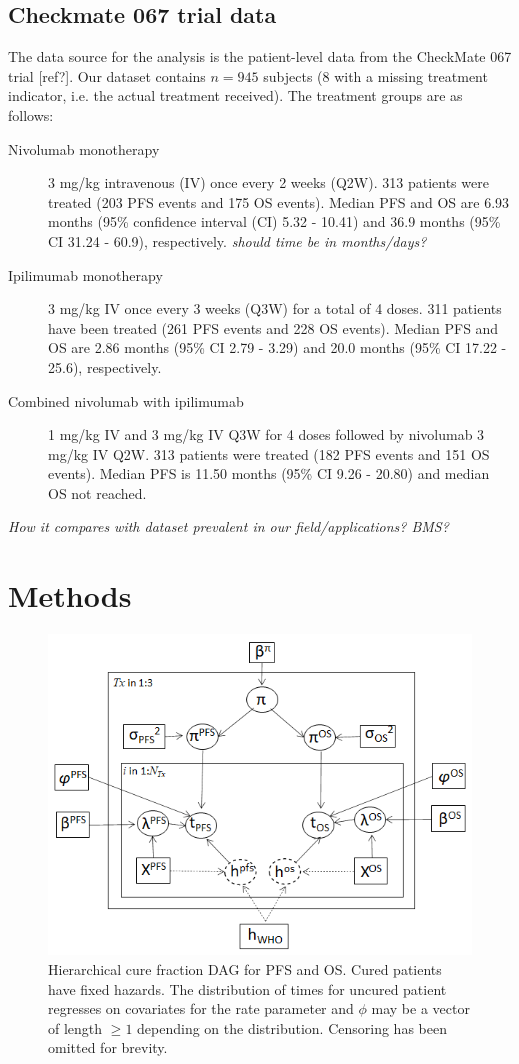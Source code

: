 \documentclass[AMA,STIX1COL]{WileyNJD-v2}
\begin{document}
\subsection{Checkmate 067 trial data}
The data source for the analysis is the patient-level data from the CheckMate 067 trial [ref?].
Our dataset contains $n = 945$ subjects (8 with a missing treatment indicator, i.e. the actual treatment received).
The treatment groups are as  follows:
\begin{description}
\item[Nivolumab monotherapy] 3 mg/kg intravenous (IV) once every 2 weeks (Q2W). 313 patients were treated (203 PFS events and 175 OS events).
Median PFS and OS are 6.93 months (95\% confidence interval (CI) 5.32 - 10.41) and 36.9 months (95\% CI 31.24 - 60.9), respectively. {\it should time be in months/days?}
\item[Ipilimumab monotherapy] 3 mg/kg IV once every 3 weeks (Q3W) for a total of 4 doses.
311 patients have been treated (261 PFS events and 228 OS events). Median PFS and OS are 2.86 months (95\% CI 2.79 - 3.29) and 20.0 months (95\% CI 17.22 - 25.6), respectively.
\item[Combined nivolumab with ipilimumab] 1 mg/kg IV and 3 mg/kg IV Q3W for 4 doses followed by nivolumab 3 mg/kg IV Q2W.
313 patients were treated (182 PFS events and 151 OS events). Median PFS is 11.50 months (95\% CI 9.26 - 20.80) and median OS not reached. 
\end{description}


{\it How it compares with dataset prevalent in our field/applications? BMS?}

%
\section{Methods}\label{sec:methods}

\begin{figure}
\centering
\includegraphics[width=0.6\linewidth]{DAG_with_Tx.png}
\caption{\label{fig:hier_dag} Hierarchical cure fraction DAG for PFS and OS.
Cured patients have fixed hazards.
The distribution of times for uncured patient regresses on covariates for the rate parameter and $\phi$ may be a vector of length $\geq 1$ depending on the distribution.
Censoring has been omitted for brevity.}
\end{figure}
\end{document}
